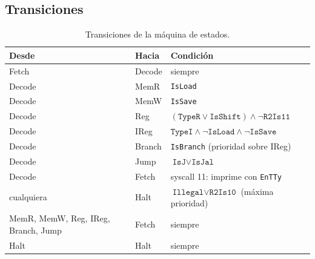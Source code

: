 \documentclass[11pt,a4paper]{article}
\newcommand{\sig}[1]{\texttt{#1}}
\begin{document}
\subsection{Transiciones}
\begin{table}[H]
\centering
\begin{tabular}{lll}
\toprule
Desde & Hacia & Condici\'on\\
\midrule
Fetch  & Decode & siempre\\
Decode & MemR   & \sig{IsLoad}\\
Decode & MemW   & \sig{IsSave}\\
Decode & Reg    & $(\sig{TypeR}\lor\sig{IsShift})\land\lnot\sig{R2Is11}$\\
Decode & IReg   & $\sig{TypeI}\land\lnot\sig{IsLoad}\land\lnot\sig{IsSave}$\\
Decode & Branch & \sig{IsBranch} (prioridad sobre IReg)\\
Decode & Jump   & $\sig{IsJ}\lor\sig{IsJal}$\\
Decode & Fetch  & syscall 11: imprime con \sig{EnTTy}\\
cualquiera & Halt & $\sig{Illegal}\lor\sig{R2Is10}$ (m\'axima prioridad)\\
MemR, MemW, Reg, IReg, Branch, Jump & Fetch & siempre\\
Halt   & Halt   & siempre\\
\bottomrule
\end{tabular}
\caption{Transiciones de la m\'aquina de estados.}
\end{table}
\end{document}
